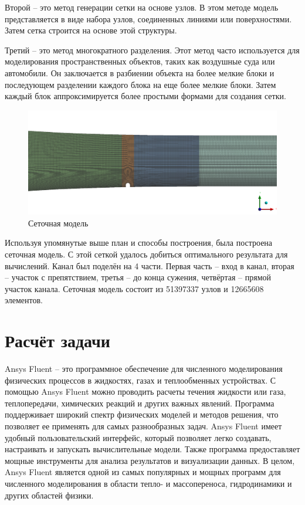 	Второй -- это метод генерации сетки на основе узлов. В этом методе модель представляется в виде набора узлов, соединенных линиями или поверхностями. Затем сетка строится на основе этой структуры.
	
	Третий -- это метод многократного разделения. Этот метод часто используется для моделирования пространственных объектов, таких как воздушные суда или автомобили. Он заключается в разбиении объекта на более мелкие блоки и последующем разделении каждого блока на еще более мелкие блоки. Затем каждый блок аппроксимируется более простыми формами для создания сетки.
	
	\begin{figure}[H]
		\centering
		\includegraphics[width=1\linewidth]{../Assets/Mesh1}
		\caption{Сеточная модель}
		\label{fig:mesh1}
	\end{figure}
	
	Используя упомянутые выше план и способы построения, была построена сеточная модель. С этой сеткой удалось добиться оптимального результата для вычислений. Канал был поделён на 4 части. Первая часть -- вход в канал, вторая -- участок с препятствием, третья -- до конца сужения, четвёртая -- прямой участок канала. Сеточная модель состоит из 51397337 узлов и 12665608 элементов.
	
\section{Расчёт задачи}
	Ansys Fluent -- это программное обеспечение для численного моделирования физических процессов в жидкостях, газах и теплообменных устройствах. С помощью Ansys Fluent можно проводить расчеты течения жидкости или газа, теплопередачи, химических реакций и других важных явлений. Программа поддерживает широкий спектр физических моделей и методов решения, что позволяет ее применять для самых разнообразных задач. Ansys Fluent имеет удобный пользовательский интерфейс, который позволяет легко создавать, настраивать и запускать вычислительные модели. Также программа предоставляет мощные инструменты для анализа результатов и визуализации данных. В целом, Ansys Fluent является одной из самых популярных и мощных программ для численного моделирования в области тепло- и массопереноса, гидродинамики и других областей физики.
	
